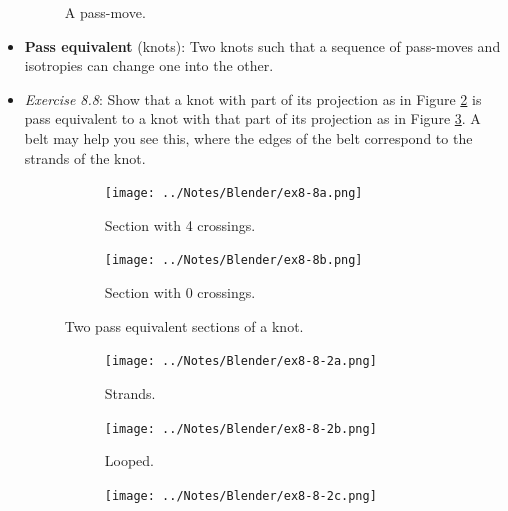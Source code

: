 \documentclass[titlepage]{article}
\numberwithin{figure}{section}
\numberwithin{table}{section}
\numberwithin{equation}{section}
\begin{document}
\begin{itemize}
\begin{figure}[h!]
        \caption{A pass-move.}
        \label{fig:passmove}
    \end{figure}
    \item \textbf{Pass equivalent} (knots): Two knots such that a sequence of pass-moves and isotropies can change one into the other.
    \item \emph{Exercise 8.8}: Show that a knot with part of its projection as in Figure \ref{fig:ex8-8a} is pass equivalent to a knot with that part of its projection as in Figure \ref{fig:ex8-8b}. A belt may help you see this, where the edges of the belt correspond to the strands of the knot.
    \begin{figure}[h!]
        \centering
        \begin{subfigure}[b]{0.3\linewidth}
            \centering
            \texttt{[image: ../Notes/Blender/ex8-8a.png]}
            \caption{Section with 4 crossings.}
            \label{fig:ex8-8a}
        \end{subfigure}
        \begin{subfigure}[b]{0.3\linewidth}
            \centering
            \texttt{[image: ../Notes/Blender/ex8-8b.png]}
            \caption{Section with 0 crossings.}
            \label{fig:ex8-8b}
        \end{subfigure}
        \caption{Two pass equivalent sections of a knot.}
        \label{fig:ex8-8}
    \end{figure}
    \begin{figure}[h!]
        \centering
        \begin{subfigure}[b]{0.25\linewidth}
            \centering
            \texttt{[image: ../Notes/Blender/ex8-8-2a.png]}
            \caption{Strands.}
            \label{fig:ex8-8-2a}
        \end{subfigure}
        \begin{subfigure}[b]{0.15\linewidth}
            \centering
            \texttt{[image: ../Notes/Blender/ex8-8-2b.png]}
            \caption{Looped.}
            \label{fig:ex8-8-2b}
        \end{subfigure}
        \begin{subfigure}[b]{0.15\linewidth}
            \centering
            \texttt{[image: ../Notes/Blender/ex8-8-2c.png]}

\end{subfigure}
\end{figure}
\end{itemize}
\end{document}
